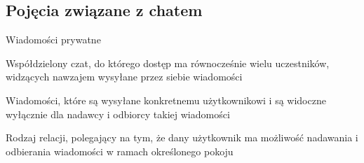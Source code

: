 \subsection{Pojęcia związane z chatem}
\label{slownik_pojec_chatu}

\begin{labeling}{Wiadomości prywatne}
    \item[Pokój] Współdzielony czat, do którego dostęp ma równocześnie wielu uczestników, widzących nawzajem
        wysyłane przez siebie wiadomości
    \item[Wiadomości prywatne] Wiadomości, które są wysyłane konkretnemu użytkownikowi i są widoczne wyłącznie
        dla nadawcy i odbiorcy takiej wiadomości
    \item[Wpięcie użytkownika w pokój] Rodzaj relacji, polegający na tym, że dany użytkownik ma możliwość
        nadawania i odbierania wiadomości w ramach określonego pokoju
\end{labeling}
